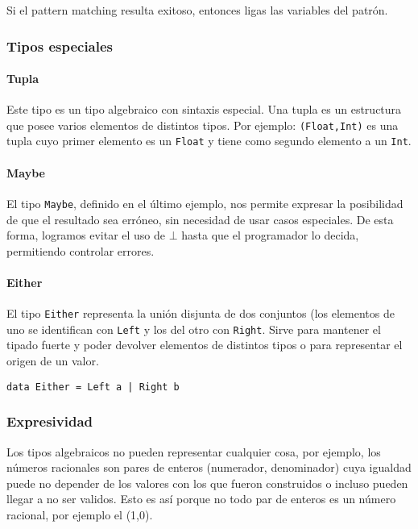 Si el pattern matching resulta exitoso, entonces ligas las variables del patrón.

\subsubsection{Tipos especiales}
\paragraph{Tupla} Este tipo es un tipo algebraico con sintaxis especial. Una tupla es un estructura que posee varios elementos de distintos tipos. Por ejemplo: \texttt{(Float,Int)} es una tupla cuyo primer elemento es un \texttt{Float} y tiene como segundo elemento a un \texttt{Int}.

\paragraph{Maybe} El tipo \texttt{Maybe}, definido en el último ejemplo, nos permite expresar la posibilidad de que el resultado sea erróneo, sin necesidad de usar casos especiales. De esta forma, logramos evitar el uso de $\bot$ hasta que el programador lo decida, permitiendo controlar errores.

\paragraph{Either} El tipo \texttt{Either} representa la unión disjunta de dos conjuntos (los elementos de uno se identifican con \texttt{Left} y los del otro con \texttt{Right}. Sirve para mantener el tipado fuerte y poder devolver elementos de distintos tipos o para representar el origen de un valor.
\begin{centrado}
	\begin{verbatim}
data Either = Left a | Right b
	\end{verbatim}
\end{centrado}

\subsubsection{Expresividad}
Los tipos algebraicos no pueden representar cualquier cosa, por ejemplo, los números racionales son pares de enteros (numerador, denominador) cuya igualdad puede no depender de los valores con los que fueron construidos o incluso pueden llegar a no ser validos. Esto es así porque no todo par de enteros es un número racional, por ejemplo el (1,0). 


